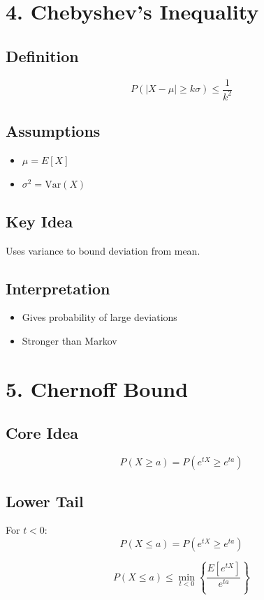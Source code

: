 \documentclass{article}
\begin{document}
\section*{4. Chebyshev's Inequality}

\subsection*{Definition}
\[
P(|X - \mu| \ge k\sigma) \le \frac{1}{k^2}
\]

\subsection*{Assumptions}
\begin{itemize}
    \item $\mu = E[X]$
    \item $\sigma^2 = \text{Var}(X)$
\end{itemize}

\subsection*{Key Idea}
Uses variance to bound deviation from mean.

\subsection*{Interpretation}
\begin{itemize}
    \item Gives probability of large deviations
    \item Stronger than Markov
\end{itemize}

\section*{5. Chernoff Bound}

\subsection*{Core Idea}
\[
P(X \ge a) = P(e^{tX} \ge e^{ta})
\]

\subsection*{Lower Tail}
For $t < 0$:
\[
P(X \le a) = P(e^{tX} \ge e^{ta})
\]

\[
P(X \le a) \le \min_{t < 0} \left\{ \frac{E[e^{tX}]}{e^{ta}} \right\}
\]
\end{document}
